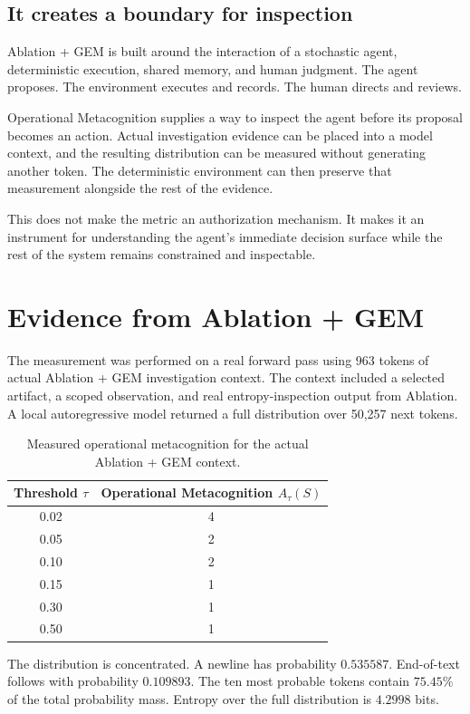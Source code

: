 \documentclass[11pt,a4paper]{article}
\begin{document}
\subsection{It creates a boundary for inspection}
Ablation + GEM is built around the interaction of a stochastic agent, deterministic execution, shared memory, and human judgment. The agent proposes. The environment executes and records. The human directs and reviews.

Operational Metacognition supplies a way to inspect the agent before its proposal becomes an action. Actual investigation evidence can be placed into a model context, and the resulting distribution can be measured without generating another token. The deterministic environment can then preserve that measurement alongside the rest of the evidence.

This does not make the metric an authorization mechanism. It makes it an instrument for understanding the agent's immediate decision surface while the rest of the system remains constrained and inspectable.

\section{Evidence from Ablation + GEM}
The measurement was performed on a real forward pass using 963 tokens of actual Ablation + GEM investigation context. The context included a selected artifact, a scoped observation, and real entropy-inspection output from Ablation. A local autoregressive model returned a full distribution over 50,257 next tokens.

\begin{table}[h]
\centering
\caption{Measured operational metacognition for the actual Ablation + GEM context.}
\label{tab:result}
\begin{tabular}{cc}
\toprule
Threshold $\tau$ & Operational Metacognition $A_\tau(S)$ \\
\midrule
0.02 & 4 \\
0.05 & 2 \\
0.10 & 2 \\
0.15 & 1 \\
0.30 & 1 \\
0.50 & 1 \\
\bottomrule
\end{tabular}
\end{table}

The distribution is concentrated. A newline has probability $0.535587$. End-of-text follows with probability $0.109893$. The ten most probable tokens contain $75.45\%$ of the total probability mass. Entropy over the full distribution is $4.2998$ bits.
\end{document}
